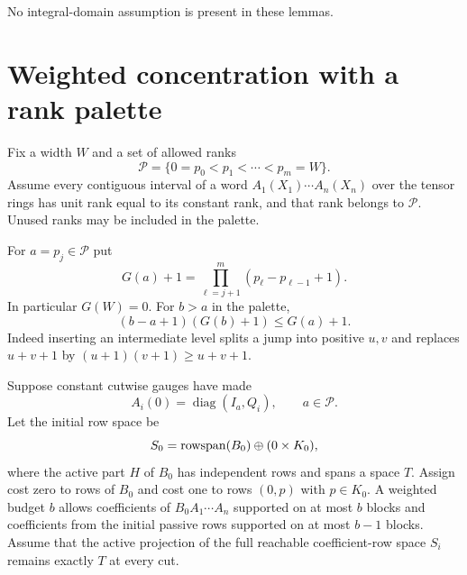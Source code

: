 No integral-domain assumption is present in these lemmas.

\section{Weighted concentration with a rank palette}

Fix a width $W$ and a set of allowed ranks
\[
 \mathcal P=\{0=p_0<p_1<\cdots<p_m=W\}.
\]
Assume every contiguous interval of a word
$A_1(X_1)\cdots A_n(X_n)$ over the tensor rings has unit rank equal
to its constant rank, and that rank belongs to $\mathcal P$.
Unused ranks may be included in the palette.

For $a=p_j\in\mathcal P$ put
\begin{equation}\label{eq:G}
 G(a)+1=\prod_{\ell=j+1}^{m}(p_\ell-p_{\ell-1}+1).
\end{equation}
In particular $G(W)=0$. For $b>a$ in the palette,
\begin{equation}\label{eq:recurrence}
 (b-a+1)(G(b)+1)\le G(a)+1.
\end{equation}
Indeed inserting an intermediate level splits a jump into positive
$u,v$ and replaces $u+v+1$ by $(u+1)(v+1)\ge u+v+1$.

Suppose constant cutwise gauges have made
\[
 A_i(0)=\operatorname{diag}(I_a,Q_i),\qquad a\in\mathcal P.
\]
Let the initial row space be
\[
 S_0=\operatorname{rowspan}(B_0)\oplus(0\times K_0),
\]
where the active part $H$ of $B_0$ has independent rows and spans a
space $T$. Assign cost zero to rows of $B_0$ and cost one to rows
$(0,p)$ with $p\in K_0$. A weighted budget $b$ allows coefficients
of $B_0A_1\cdots A_n$ supported on at most $b$ blocks and coefficients
from the initial passive rows supported on at most $b-1$ blocks.
Assume that the active projection of the full reachable coefficient-row
space $S_i$ remains exactly $T$ at every cut.

